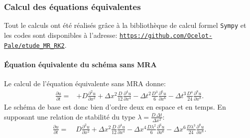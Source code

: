 \subsubsection{Calcul des équations équivalentes}
Tout le calculs ont été réalisés grâce à la bibliothèque de calcul formel \texttt{Sympy} et les codes 
sont disponibles à l'adresse: \href{https://github.com/Ocelot-Pale/etude_MR_RK2}{\nolinkurl{https://github.com/Ocelot-Pale/etude_MR_RK2}}.
\paragraph{Équation équivalente du schéma sans MRA}
    Le calcul de l'équation équivalente sans MRA donne:
    \begin{align}
        \frac{\partial u}{\partial t}  =&+ D \frac{\partial^{2}u}{\partial x^{2}} 
        + \Delta x^{2} \frac{D}{12}             \frac{\partial^{4}u}{\partial x^{4}} 
        -  \Delta t^{2} \frac{D^{3}}{6}          \frac{\partial^{6}u}{\partial x^{6}} 
        -  \Delta t^{3} \frac{D^{4}}{24}        \frac{\partial^{8}u}{\partial x^{8}}.
    \end{align}
    Le schéma de base est donc bien d'ordre deux en espace et en temps.
    En supposant une relation de stabilité du type $\lambda = \frac{D\, \Delta t }{\Delta x^2}$:
    \begin{align}
        \frac{\partial u}{\partial t}  =&\; D \frac{\partial^{2}u}{\partial x^{2}} 
        + \Delta x^{2} \frac{D}{12}             \frac{\partial^{4}u}{\partial x^{4}}
        - \Delta x^{4} \frac{D \lambda^2}{6}     \frac{\partial^{6}u}{\partial x^{6}}
        - \Delta x^{6} \frac{D \lambda^3}{24}    \frac{\partial^{8}u}{\partial x^{8}}.
    \end{align}

